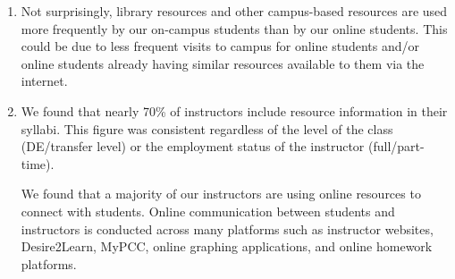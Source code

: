 \begin{enumerate}[label=Q\arabic*.,font=\bf]
	\item Not surprisingly, library resources and other campus-based resources are used more frequently by our on-campus students than by our online students.
	      This could be due to less frequent visits to campus for online students and/or online students already having similar resources available to them via the internet.
	\item We found that nearly 70\% of instructors include resource information in their syllabi.
	      This figure was consistent regardless of the level of the class (DE/transfer level) or the employment status of the instructor (full/part-time).

	      We found that a majority of our instructors are using online resources to connect with students.
	      Online communication between students and instructors is conducted across many platforms such as instructor websites, Desire2Learn, MyPCC, online graphing applications, and online homework platforms.


\end{enumerate}
